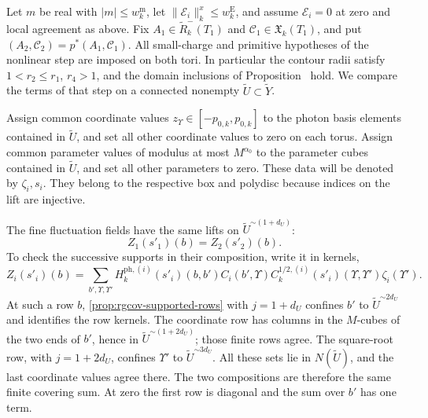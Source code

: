 Let $m$ be real with $|m|\le w_k^{\mathrm m}$, let
$\|\mathscr E_i\|_k^x\le w_k^{\mathrm E}$, and assume
$\mathscr E_i=0$ at zero and local agreement as above.
Fix $A_1\in\widetilde R_k^-(T_1)$ and
$\mathscr C_1\in\mathfrak X_k(T_1)$, and put
$(A_2,\mathscr C_2)=p^*(A_1,\mathscr C_1)$.
All small-charge and primitive hypotheses of the
nonlinear step are imposed on both tori.
In particular the contour radii satisfy
$1<r_2\le r_1$, $r_4>1$, and the domain inclusions
of Proposition~ hold.
We compare the terms of that step on a connected
nonempty $\widetilde U\subset\widetilde Y$.

Assign common coordinate values
$z_\Upsilon\in[-p_{0,k},p_{0,k}]$ to the photon basis
elements contained in $\widetilde U$, and set all
other coordinate values to zero on each torus.
Assign common parameter values of modulus at most
$M^{\alpha_0}$ to the parameter cubes contained in
$\widetilde U$, and set all other parameters to zero.
These data will be denoted by $\zeta_i,s_i$.
They belong to the respective box and polydisc
because indices on the lift are injective.

The fine fluctuation fields have the same lifts on
$\widetilde U^{\sim(1+d_U)}$:
\begin{equation}\label{eq:rgcov-fine-fluctuation}
                         Z_1(s'_1)(b)=Z_2(s'_2)(b).
\end{equation}
To check the successive supports in their composition,
write it in kernels,
\[
 Z_i(s'_i)(b)
  =\sum_{b',\Upsilon,\Upsilon'}
    H_k^{\mathrm{ph},(i)}(s'_i)(b,b')
          C_i(b',\Upsilon)
            C_k^{1/2,(i)}(s'_i)(\Upsilon,\Upsilon')\zeta_i(\Upsilon').
\]
At such a row $b$, \cref{prop:rgcov-supported-rows}
with $j=1+d_U$ confines $b'$ to
$\widetilde U^{\sim2d_U}$ and identifies the row kernels.
The coordinate row has columns in the $M$-cubes of
the two ends of $b'$, hence in
$\widetilde U^{\sim(1+2d_U)}$; those finite rows agree.
The square-root row, with $j=1+2d_U$, confines
$\Upsilon'$ to $\widetilde U^{\sim3d_U}$.
All these sets lie in $N(\widetilde U)$, and the
last coordinate values agree there.
The two compositions are therefore the same finite
covering sum. At zero the first row is diagonal
and the sum over $b'$ has one term.

